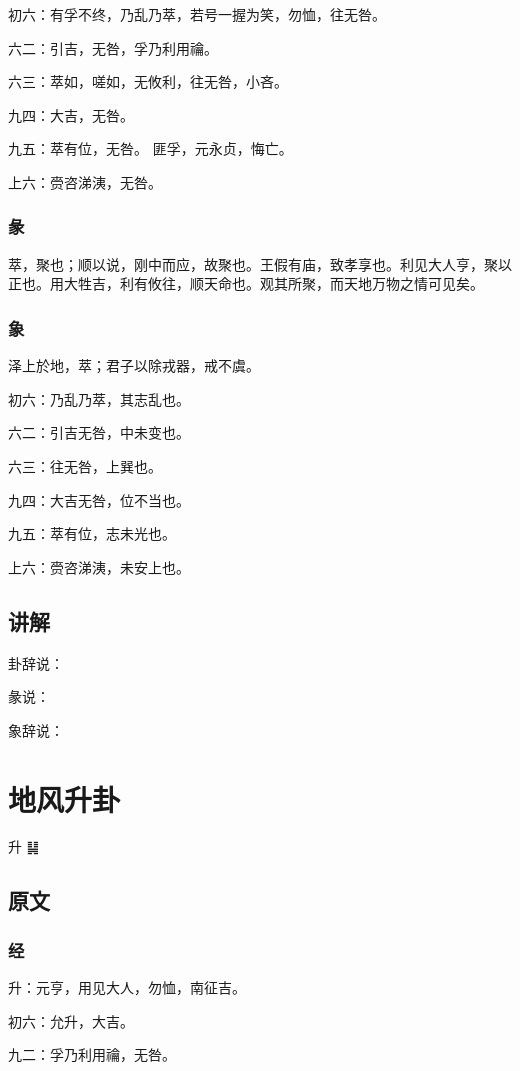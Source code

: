 \documentclass[12pt,oneside]{book}
\begin{document}
初六：有孚不终，乃乱乃萃，若号一握为笑，勿恤，往无咎。

六二：引吉，无咎，孚乃利用禴。

六三：萃如，嗟如，无攸利，往无咎，小吝。

九四：大吉，无咎。

九五：萃有位，无咎。 匪孚，元永贞，悔亡。

上六：赍咨涕洟，无咎。

\subsection{彖}
萃，聚也；顺以说，刚中而应，故聚也。王假有庙，致孝享也。利见大人亨，聚以正也。用大牲吉，利有攸往，顺天命也。观其所聚，而天地万物之情可见矣。

\subsection{象}
泽上於地，萃；君子以除戎器，戒不虞。

初六：乃乱乃萃，其志乱也。

六二：引吉无咎，中未变也。

六三：往无咎，上巽也。

九四：大吉无咎，位不当也。

九五：萃有位，志未光也。

上六：赍咨涕洟，未安上也。

\section{讲解}
卦辞说：

彖说：

象辞说：

\chapter{地风升卦}
升 {\Large ䷭}

\section{原文}

\subsection{经}
升：元亨，用见大人，勿恤，南征吉。

初六：允升，大吉。

九二：孚乃利用禴，无咎。
\end{document}
